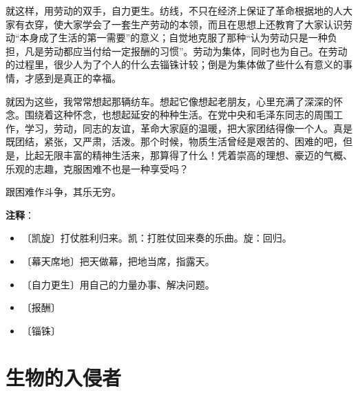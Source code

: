 \documentclass[12pt,UTF-8,openany]{ctexbook}
\begin{document}
\begin{large}
    就这样，用劳动的双手，自力更生。纺线，不只在经济上保证了革命根据地的人大家有衣穿，使大家学会了一套生产劳动的本领，而且在思想上还教育了大家认识劳动“本身成了生活的第一需要”的意义；自觉地克服了那种“认为劳动只是一种负担，凡是劳动都应当付给一定报酬的习惯”。劳动为集体，同时也为自己。在劳动的过程里，很少人为了个人的什么去锱铢计较；倒是为集体做了些什么有意义的事情，才感到是真正的幸福。
    
    就因为这些，我常常想起那辆纺车。想起它像想起老朋友，心里充满了深深的怀念。围绕着这种怀念，也想起延安的种种生活。在党中央和毛泽东同志的周围工作，学习，劳动，同志的友谊，革命大家庭的温暖，把大家团结得像一个人。真是既团结，紧张，又严肃，活泼。那个时候，物质生活曾经是艰苦的、困难的吧，但是，比起无限丰富的精神生活来，那算得了什么！凭着崇高的理想、豪迈的气概、乐观的志趣，克服困难不也是一种享受吗？
    
    跟困难作斗争，其乐无穷。
    
\end{large}


\newpage

\textbf{注释}：

\vspace{-1em}

\begin{itemize}
    \setlength\itemsep{-0.2em}
    \item 〔凯旋〕打仗胜利归来。凯：打胜仗回来奏的乐曲。旋：回归。
    \item 〔幕天席地〕把天做幕，把地当席，指露天。
    \item 〔自力更生〕用自己的力量办事、解决问题。
    \item 〔报酬〕
    \item 〔锱铢〕
\end{itemize}

\chapter{生物的入侵者}
\end{document}
